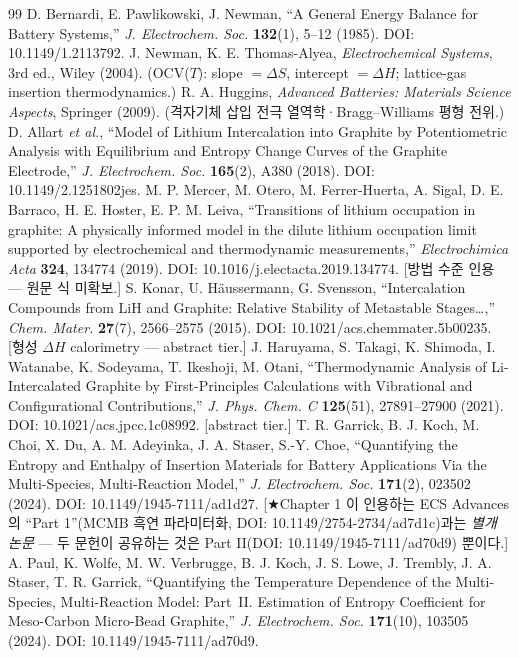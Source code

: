 \begin{thebibliography}{99}
 D. Bernardi, E. Pawlikowski, J. Newman, ``A General Energy Balance for Battery Systems,'' \emph{J. Electrochem. Soc.} \textbf{132}(1), 5--12 (1985). DOI: 10.1149/1.2113792.
 J. Newman, K. E. Thomas-Alyea, \emph{Electrochemical Systems}, 3rd ed., Wiley (2004). (OCV($T$): slope $=\Delta S$, intercept $=\Delta H$; lattice-gas insertion thermodynamics.)
 R. A. Huggins, \emph{Advanced Batteries: Materials Science Aspects}, Springer (2009). (격자기체 삽입 전극 열역학·Bragg--Williams 평형 전위.)
 D. Allart \emph{et al.}, ``Model of Lithium Intercalation into Graphite by Potentiometric Analysis with Equilibrium and Entropy Change Curves of the Graphite Electrode,'' \emph{J. Electrochem. Soc.} \textbf{165}(2), A380 (2018). DOI: 10.1149/2.1251802jes.
 M. P. Mercer, M. Otero, M. Ferrer-Huerta, A. Sigal, D. E. Barraco, H. E. Hoster, E. P. M. Leiva, ``Transitions of lithium occupation in graphite: A physically informed model in the dilute lithium occupation limit supported by electrochemical and thermodynamic measurements,'' \emph{Electrochimica Acta} \textbf{324}, 134774 (2019). DOI: 10.1016/j.electacta.2019.134774. [방법 수준 인용 --- 원문 식 미확보.]
 S. Konar, U. Häussermann, G. Svensson, ``Intercalation Compounds from LiH and Graphite: Relative Stability of Metastable Stages\ldots,'' \emph{Chem. Mater.} \textbf{27}(7), 2566--2575 (2015). DOI: 10.1021/acs.chemmater.5b00235. [형성 $\Delta H$ calorimetry --- abstract tier.]
 J. Haruyama, S. Takagi, K. Shimoda, I. Watanabe, K. Sodeyama, T. Ikeshoji, M. Otani, ``Thermodynamic Analysis of Li-Intercalated Graphite by First-Principles Calculations with Vibrational and Configurational Contributions,'' \emph{J. Phys. Chem. C} \textbf{125}(51), 27891--27900 (2021). DOI: 10.1021/acs.jpcc.1c08992. [abstract tier.]
 T. R. Garrick, B. J. Koch, M. Choi, X. Du, A. M. Adeyinka, J. A. Staser, S.-Y. Choe, ``Quantifying the Entropy and Enthalpy of Insertion Materials for Battery Applications Via the Multi-Species, Multi-Reaction Model,'' \emph{J. Electrochem. Soc.} \textbf{171}(2), 023502 (2024). DOI: 10.1149/1945-7111/ad1d27. [★Chapter 1 이 인용하는 ECS Advances 의 ``Part 1''(MCMB 흑연 파라미터화, DOI: 10.1149/2754-2734/ad7d1c)과는 \emph{별개 논문} --- 두 문헌이 공유하는 것은 Part II(DOI: 10.1149/1945-7111/ad70d9) 뿐이다.]
 A. Paul, K. Wolfe, M. W. Verbrugge, B. J. Koch, J. S. Lowe, J. Trembly, J. A. Staser, T. R. Garrick, ``Quantifying the Temperature Dependence of the Multi-Species, Multi-Reaction Model: Part~II. Estimation of Entropy Coefficient for Meso-Carbon Micro-Bead Graphite,'' \emph{J. Electrochem. Soc.} \textbf{171}(10), 103505 (2024). DOI: 10.1149/1945-7111/ad70d9.

\end{thebibliography}
